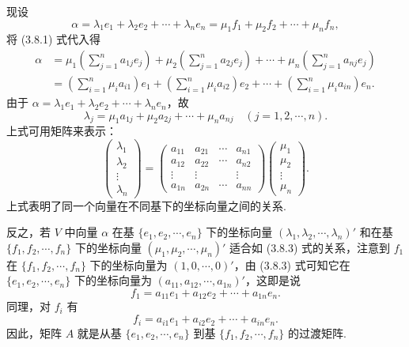 \documentclass[UTF8, 12pt, fontset=fandol, oneside]{ctexart}
\begin{document}
现设
\[
\alpha=\lambda_1e_1+\lambda_2e_2+\cdots+\lambda_ne_n=\mu_1f_1+\mu_2f_2+\cdots+\mu_nf_n,
\]
将 (3.8.1) 式代入得
\[
\begin{aligned}
\alpha&=\mu_1\left(\sum_{j=1}^n a_{1j}e_j\right)+\mu_2\left(\sum_{j=1}^n a_{2j}e_j\right)+\cdots+\mu_n\left(\sum_{j=1}^n a_{nj}e_j\right)\\
&=\left(\sum_{i=1}^n \mu_i a_{i1}\right)e_1+\left(\sum_{i=1}^n \mu_i a_{i2}\right)e_2+\cdots+\left(\sum_{i=1}^n \mu_i a_{in}\right)e_n.
\end{aligned}
\]
由于 $\alpha=\lambda_1e_1+\lambda_2e_2+\cdots+\lambda_ne_n$，故
\begin{equation}
\lambda_j=\mu_1a_{1j}+\mu_2a_{2j}+\cdots+\mu_na_{nj}\quad (j=1,2,\cdots,n).
\tag{3.8.2}
\end{equation}
上式可用矩阵来表示：
\begin{equation}
\left(\begin{array}{c}
\lambda_1\\
\lambda_2\\
\vdots\\
\lambda_n
\end{array}\right)
=
\left(\begin{array}{cccc}
a_{11}&a_{21}&\cdots&a_{n1}\\
a_{12}&a_{22}&\cdots&a_{n2}\\
\vdots&\vdots&&\vdots\\
a_{1n}&a_{2n}&\cdots&a_{nn}
\end{array}\right)
\left(\begin{array}{c}
\mu_1\\
\mu_2\\
\vdots\\
\mu_n
\end{array}\right).
\tag{3.8.3}
\end{equation}
上式表明了同一个向量在不同基下的坐标向量之间的关系.

反之，若 $V$ 中向量 $\alpha$ 在基 $\{e_1,e_2,\cdots,e_n\}$ 下的坐标向量 $(\lambda_1,\lambda_2,\cdots,\lambda_n)'$ 和在基 $\{f_1,f_2,\cdots,f_n\}$ 下的坐标向量 $(\mu_1,\mu_2,\cdots,\mu_n)'$ 适合如 (3.8.3) 式的关系，注意到 $f_1$ 在 $\{f_1,f_2,\cdots,f_n\}$ 下的坐标向量为 $(1,0,\cdots,0)'$，由 (3.8.3) 式可知它在 $\{e_1,e_2,\cdots,e_n\}$ 下的坐标向量为 $(a_{11},a_{12},\cdots,a_{1n})'$，这即是说
\[
f_1=a_{11}e_1+a_{12}e_2+\cdots+a_{1n}e_n.
\]
同理，对 $f_i$ 有
\[
f_i=a_{i1}e_1+a_{i2}e_2+\cdots+a_{in}e_n.
\]
因此，矩阵 $A$ 就是从基 $\{e_1,e_2,\cdots,e_n\}$ 到基 $\{f_1,f_2,\cdots,f_n\}$ 的过渡矩阵.
\end{document}
